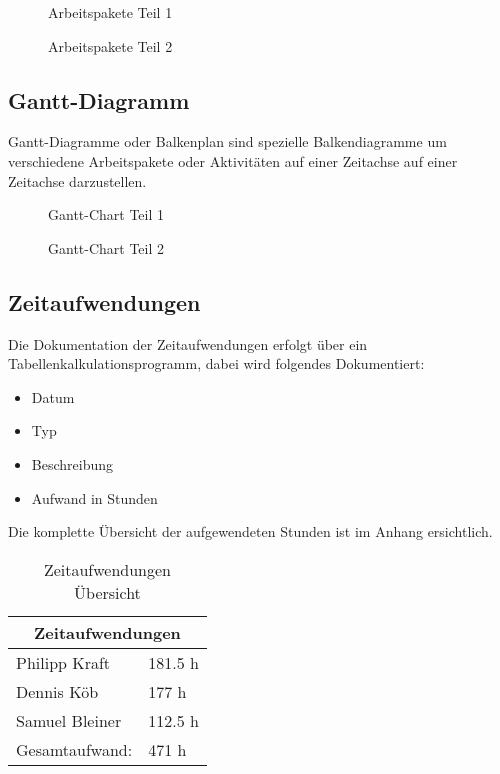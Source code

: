 \begin{figure}[H]
  \centering
  \caption{Arbeitspakete Teil 1}
\end{figure}

\begin{figure}[H]
  \centering
  \caption{Arbeitspakete Teil 2}
\end{figure}

\subsection{Gantt-Diagramm}
Gantt-Diagramme oder Balkenplan sind spezielle Balkendiagramme um verschiedene
Arbeitspakete oder Aktivitäten auf einer Zeitachse auf einer Zeitachse
darzustellen.

\begin{sidewaysfigure}
  \centering
  \caption{Gantt-Chart Teil 1}
\end{sidewaysfigure}

\begin{sidewaysfigure}
  \centering
  \caption{Gantt-Chart Teil 2}
\end{sidewaysfigure}

\subsection{Zeitaufwendungen}

Die Dokumentation der Zeitaufwendungen erfolgt über ein
Tabellenkalkulationsprogramm, dabei wird folgendes Dokumentiert:

\begin{itemize}
  \item Datum
  \item Typ
  \item Beschreibung
  \item Aufwand in Stunden
\end{itemize}

Die komplette Übersicht der aufgewendeten Stunden ist im Anhang ersichtlich.

\begin{table}[H]
  \centering
  \begin{tabular}{@{}ll@{}}
  \toprule
  \multicolumn{2}{c}{\textbf{Zeitaufwendungen}} \\ \midrule
  Philipp Kraft             & 181.5 h           \\
  Dennis Köb                & 177 h             \\
  Samuel Bleiner            & 112.5 h           \\ \midrule
  Gesamtaufwand:            & 471 h             \\ \bottomrule
  \end{tabular}
  \caption{Zeitaufwendungen Übersicht}
\end{table}